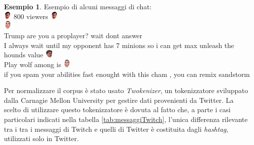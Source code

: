 \documentclass[a4paper,12pt,openright,twoside]{report}
\theoremstyle{definition}
\newtheorem{es}{Esempio}[section]
\begin{document}
\begin{es} Esempio di alcuni messaggi di chat:\\
	\includegraphics[height=0.4cm, width=0.4cm]{Immagini/Emoticons/elegiggle.png} 800 viewers \includegraphics[height=0.4cm, width=0.4cm]{Immagini/Emoticons/elegiggle.png} \\
\includegraphics[height=0.4cm, width=0.4cm]{Immagini/Emoticons/4head.png}\\
Trump are you a proplayer? wait dont answer\\
I always wait until my opponent has 7 minions so i can get max unleash the hounds value \includegraphics[height=0.4cm, width=0.4cm]{Immagini/Emoticons/kappahd.png}\\
Play wolf among is \includegraphics[height=0.4cm, width=0.4cm]{Immagini/Emoticons/4head.png}\\
if you spam your abilities fast enought with this cham , you can remix sandstorm\\
	\label{es:frasi}
\end{es}
Per normalizzare il corpus è stato usato \emph{Twokenizer}, un tokenizzatore sviluppato dalla Carnagie Mellon University
per gestire dati provenienti da Twitter. 
La scelto di utilizzare questo tokenizzatore è dovuta al fatto che, a parte i casi particolari indicati 
nella tabella
\ref{tab:messaggiTwitch}, l'unica differenza rilevante tra i tra i messaggi di Twitch e
quelli di Twitter è costituita dagli
\emph{hashtag}, utilizzati solo in Twitter. 
\end{document}
